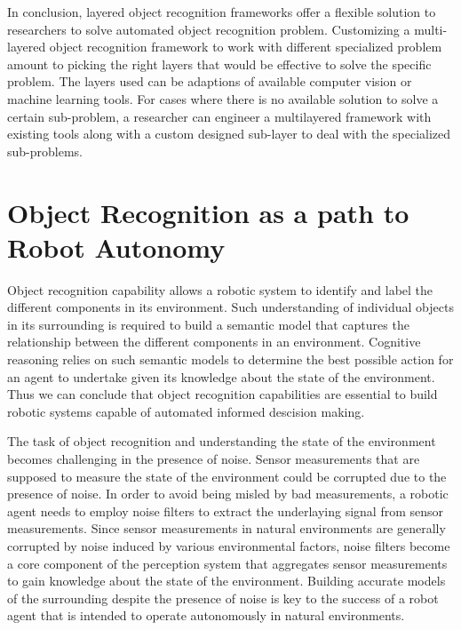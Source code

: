 \documentclass {udthesis}
\begin{document}
In conclusion, layered object recognition frameworks offer a flexible solution to researchers to solve automated object recognition problem. Customizing a multi-layered object recognition framework to work with different specialized problem amount to picking the right layers that would be effective to solve the specific problem. The layers used can be adaptions of available computer vision or machine learning tools. For cases where there is no available solution to solve a certain sub-problem, a researcher can engineer a multilayered framework with existing tools along with a custom designed sub-layer to deal with the specialized sub-problems.

\section{Object Recognition as a path to Robot Autonomy}

Object recognition capability allows a robotic system to identify and label the different components in its environment. Such understanding of individual objects in its surrounding is required to build a semantic model that captures the relationship between the different components in an environment.
Cognitive reasoning relies on such semantic models to determine the best possible action for an agent to undertake given its knowledge about the state of the environment. Thus we can conclude that object recognition capabilities are essential to build robotic systems capable of automated informed descision making.

The task of object recognition and understanding the state of the environment becomes challenging in the presence of noise. Sensor measurements
that are supposed to measure the state of the environment could be corrupted due to the presence of noise. In order to avoid being misled by bad measurements,
a robotic agent needs to employ noise filters to extract the underlaying signal from sensor measurements. Since sensor measurements in natural environments are generally corrupted by noise induced by various environmental factors, noise filters become a core component of the perception system that aggregates sensor measurements to gain knowledge about the state of the environment. Building accurate models of the surrounding despite the presence of noise is key to the success of a robot agent that is intended to operate autonomously in natural environments.
\end{document}
